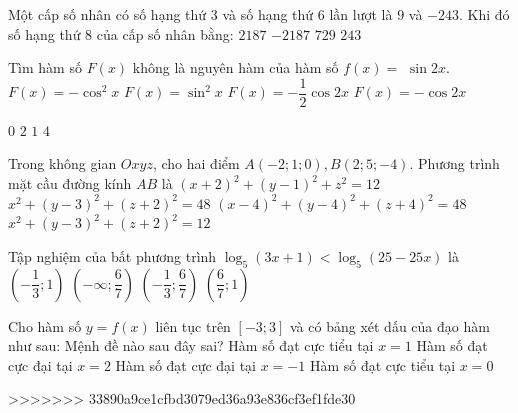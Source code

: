 \begin{ex}%
Một cấp số nhân có số hạng thứ $3$ và số hạng thứ $6$ lần lượt là $9$ và $-243$. Khi đó số hạng thứ $8$ của cấp số nhân bằng:
\choice
{$2187$}
{\True $-2187$}
{$729$}
{$243$}

\end{ex}
\begin{ex}%
Tìm hàm số $F(x)$ không là nguyên hàm của hàm số $f(x)=$ $\sin 2 x$.
\choice
{$F(x)=-\cos ^2 x$}
{$F(x)=\sin ^2 x$}
{$F(x)=-\dfrac{1}{2} \cos 2 x$}
{\True $F(x)=-\cos 2 x$}

\end{ex}
\begin{ex}%
{\vspace{-0.5cm}
}
\choice
{$0$}
{\True $2$}
{$1$}
{$4$}
\end{ex}
\begin{ex}%
Trong không gian $O x y z$, cho hai điểm $A(-2; 1; 0), B(2; 5;-4)$.
Phương trình mặt cầu đường kính $AB$ là
\choice
{$(x+2)^2+(y-1)^2+z^2=12$}
{$x^2+(y-3)^2+(z+2)^2=48$}
{$(x-4)^2+(y-4)^2+(z+4)^2=48$}
{\True $x^2+(y-3)^2+(z+2)^2=12$}

\end{ex}
\begin{ex}%
Tập nghiệm của bất phương trình $\log_5(3 x+1)<\log_5(25-25 x)$ là
\choice
{$\left(-\dfrac{1}{3}; 1\right)$}
{$\left(-\infty; \dfrac{6}{7}\right)$}
{\True $\left(-\dfrac{1}{3}; \dfrac{6}{7}\right)$}
{$\left(\dfrac{6}{7}; 1\right)$}

\end{ex}
\begin{ex}%
Cho hàm số $y=f(x)$ liên tục trên $[-3; 3]$ và có bảng xét dấu của đạo hàm như sau:
Mệnh đề nào sau đây sai?
\choice
{Hàm số đạt cực tiểu tại $x=1$}
{Hàm số đạt cực đại tại $x=2$}
{Hàm số đạt cực đại tại $x=-1$}
{\True Hàm số đạt cực tiểu tại $x=0$}

\end{ex}

>>>>>>> 33890a9ce1cfbd3079ed36a93e836cf3ef1fde30
